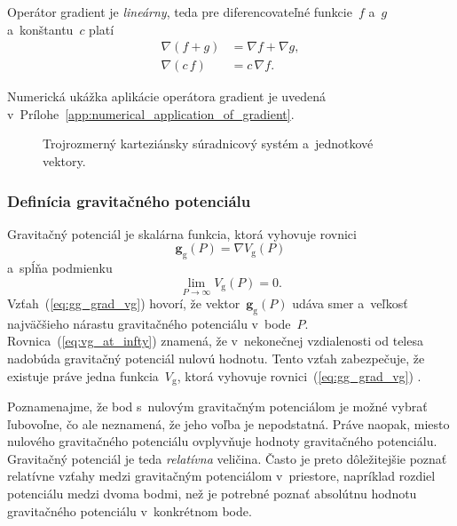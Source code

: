 \documentclass[a4paper, 12pt]{book}
\newcommand{\gidx}{\mathrm g}
\let\vec\mathbf
\begin{document}
Operátor gradient je \emph{lineárny}, teda pre diferencovateľné funkcie~$f$ 
a~$g$ a~konštantu~$c$ platí
%
\begin{align}
\label{eq:gradient_additivity}
\nabla \left(f + g \right) &= \nabla f + \nabla g{,}\\
%
\label{eq:gradient_homogenity}
\nabla (c \, f) &= c \, \nabla f{.}
\end{align}

Numerická ukážka aplikácie operátora gradient je uvedená 
v~Prílohe~\ref{app:numerical_application_of_gradient}.

\begin{figure}
\centering

\caption{Trojrozmerný karteziánsky súradnicový systém a~jednotkové vektory.}
\label{fig:3d_coord_system}
\end{figure}

\subsubsection{Definícia gravitačného potenciálu}

Gravitačný potenciál je skalárna funkcia, ktorá vyhovuje rovnici 
\parencite{SansoGeoidDetermination}
%
\begin{equation}
\label{eq:gg_grad_vg}
\vec g_\gidx(P) = \nabla V_\gidx(P)
\end{equation}
%
a~spĺňa podmienku
%
\begin{equation}
\label{eq:vg_at_infty}
\lim_{P \to \infty} V_\gidx(P) = 0{.}
\end{equation}
%
Vzťah~(\ref{eq:gg_grad_vg}) hovorí, že vektor~$\vec g_\gidx(P)$ udáva smer 
a~veľkosť najväčšieho nárastu gravitačného potenciálu v~bode~$P$.  
Rovnica~(\ref{eq:vg_at_infty}) znamená, že v~nekonečnej vzdialenosti od telesa 
nadobúda gravitačný potenciál nulovú hodnotu.  Tento vzťah zabezpečuje, že 
existuje práve jedna funkcia~$V_\gidx$, ktorá vyhovuje 
rovnici~(\ref{eq:gg_grad_vg}) \parencite{SansoGeoidDetermination}.

Poznamenajme, že bod s~nulovým gravitačným potenciálom je možné vybrať 
ľubovoľne, čo ale neznamená, že jeho voľba je nepodstatná.  Práve naopak, 
miesto nulového gravitačného potenciálu ovplyvňuje hodnoty gravitačného 
potenciálu.  Gravitačný potenciál je teda \emph{relatívna} veličina.  Často je 
preto dôležitejšie poznať relatívne vzťahy medzi gravitačným potenciálom 
v~priestore, napríklad rozdiel potenciálu medzi dvoma bodmi, než je potrebné 
poznať absolútnu hodnotu gravitačného potenciálu v~konkrétnom bode.
\end{document}
